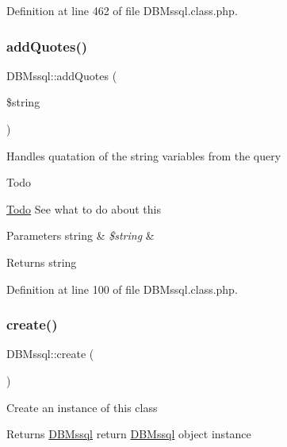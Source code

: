 Definition at line 462 of file D\+B\+Mssql.\+class.\+php.

\mbox{\label{classDBMssql_ac380f1918abd17fd5cba28accfaec9fc}} 
\subsubsection{\texorpdfstring{add\+Quotes()}{addQuotes()}}
{\footnotesize\ttfamily D\+B\+Mssql\+::add\+Quotes (\begin{DoxyParamCaption}\item[{}]{\$string }\end{DoxyParamCaption})}

Handles quatation of the string variables from the query \begin{DoxyRefDesc}{Todo}
\item[\hyperlink{todo__todo000001}{Todo}]See what to do about this \end{DoxyRefDesc}

\begin{DoxyParams}[1]{Parameters}
string & {\em \$string} & \\
\hline
\end{DoxyParams}
\begin{DoxyReturn}{Returns}
string 
\end{DoxyReturn}


Definition at line 100 of file D\+B\+Mssql.\+class.\+php.

\mbox{\label{classDBMssql_a1be3ce3432e43e0a5080ada450971345}} 
\subsubsection{\texorpdfstring{create()}{create()}}
{\footnotesize\ttfamily D\+B\+Mssql\+::create (\begin{DoxyParamCaption}{ }\end{DoxyParamCaption})}

Create an instance of this class \begin{DoxyReturn}{Returns}
\hyperlink{classDBMssql}{D\+B\+Mssql} return \hyperlink{classDBMssql}{D\+B\+Mssql} object instance 
\end{DoxyReturn}


